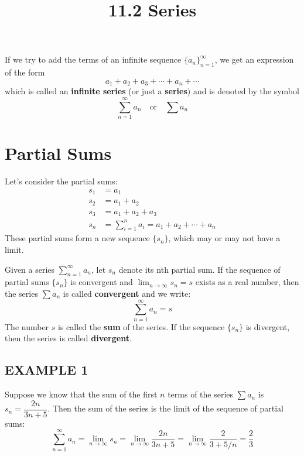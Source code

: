 \documentclass{article}
\title{11.2 Series}
\date{}
\author{}
\theoremstyle{mystyle}
\begin{document}
\maketitle

If we try to add the terms of an infinite sequence \(\{a_n\}_{n=1}^\infty\), we get an expression of the form
\[ a_1 + a_2 + a_3 + \cdots + a_n + \cdots \]
which is called an \textbf{infinite series} (or just a \textbf{series}) and is denoted by the symbol
\[ \sum_{n=1}^{\infty} a_n \quad \text{or} \quad \sum a_n \]

\section*{Partial Sums}
Let's consider the partial sums:
\begin{align*}
s_1 &= a_1 \\
s_2 &= a_1 + a_2 \\
s_3 &= a_1 + a_2 + a_3 \\
s_n &= \sum_{i=1}^{n} a_i = a_1 + a_2 + \cdots + a_n
\end{align*}
These partial sums form a new sequence \(\{s_n\}\), which may or may not have a limit.

\begin{tcolorbox}[
    colback=white,
    colframe=orange!80!white,
    title=Definition of a Convergent Series,
    boxrule=0.5mm,
    arc=3mm
    ]
    Given a series \( \sum_{n=1}^{\infty} a_n \), let \(s_n\) denote its nth partial sum. If the sequence of partial sums \(\{s_n\}\) is convergent and \( \lim_{n\to\infty} s_n = s \) exists as a real number, then the series \( \sum a_n \) is called \textbf{convergent} and we write:
    \[ \sum_{n=1}^{\infty} a_n = s \]
    The number \(s\) is called the \textbf{sum} of the series. If the sequence \(\{s_n\}\) is divergent, then the series is called \textbf{divergent}.
\end{tcolorbox}

\subsection*{EXAMPLE 1}
Suppose we know that the sum of the first \(n\) terms of the series \( \sum a_n \) is \( s_n = \dfrac{2n}{3n+5} \). Then the sum of the series is the limit of the sequence of partial sums:
\[ \sum_{n=1}^{\infty} a_n = \lim_{n\to\infty} s_n = \lim_{n\to\infty} \dfrac{2n}{3n+5} = \lim_{n\to\infty} \dfrac{2}{3+5/n} = \dfrac{2}{3} \]
\end{document}
